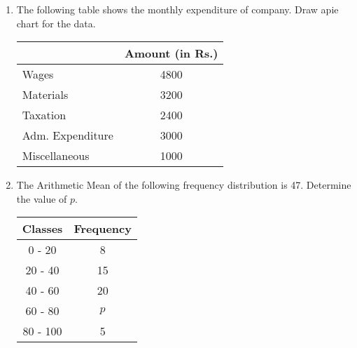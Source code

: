 \begin{enumerate}
\item The following table shows the monthly expenditure of company. Draw apie chart for the data.

\begin{tabular}{|l|c|}
\hline
\ & Amount (in Rs.) \\
\hline
Wages & 4800 \\
Materials & 3200 \\
Taxation & 2400 \\
Adm. Expenditure & 3000 \\
Miscellaneous & 1000 \\
\hline
\end{tabular}


\item The Arithmetic Mean of the following frequency distribution is 47. Determine the value of $p$.
\begin{tabular}{|c|c|}
\hline
Classes & Frequency \\
\hline
0 - 20 & 8 \\
20 - 40 & 15 \\
40 - 60 & 20 \\
60 - 80 & $p$ \\
80 - 100 & 5 \\
\hline
\end{tabular}



\end{enumerate}



